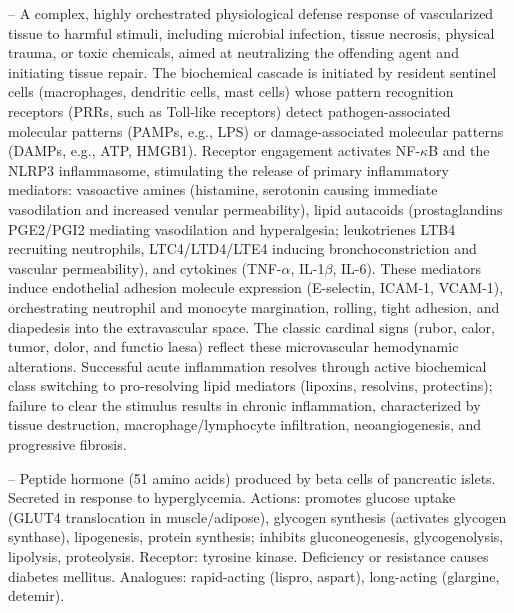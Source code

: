 -- A complex, highly orchestrated physiological defense response of vascularized tissue to harmful stimuli, including microbial infection, tissue necrosis, physical trauma, or toxic chemicals, aimed at neutralizing the offending agent and initiating tissue repair. The biochemical cascade is initiated by resident sentinel cells (macrophages, dendritic cells, mast cells) whose pattern recognition receptors (PRRs, such as Toll-like receptors) detect pathogen-associated molecular patterns (PAMPs, e.g., LPS) or damage-associated molecular patterns (DAMPs, e.g., ATP, HMGB1). Receptor engagement activates NF-$\kappa$B and the NLRP3 inflammasome, stimulating the release of primary inflammatory mediators: vasoactive amines (histamine, serotonin causing immediate vasodilation and increased venular permeability), lipid autacoids (prostaglandins PGE2/PGI2 mediating vasodilation and hyperalgesia; leukotrienes LTB4 recruiting neutrophils, LTC4/LTD4/LTE4 inducing bronchoconstriction and vascular permeability), and cytokines (TNF-$\alpha$, IL-1$\beta$, IL-6). These mediators induce endothelial adhesion molecule expression (E-selectin, ICAM-1, VCAM-1), orchestrating neutrophil and monocyte margination, rolling, tight adhesion, and diapedesis into the extravascular space. The classic cardinal signs (rubor, calor, tumor, dolor, and functio laesa) reflect these microvascular hemodynamic alterations. Successful acute inflammation resolves through active biochemical class switching to pro-resolving lipid mediators (lipoxins, resolvins, protectins); failure to clear the stimulus results in chronic inflammation, characterized by tissue destruction, macrophage/lymphocyte infiltration, neoangiogenesis, and progressive fibrosis.

-- Peptide hormone (51 amino acids) produced by beta cells of pancreatic islets. Secreted in response to hyperglycemia. Actions: promotes glucose uptake (GLUT4 translocation in muscle/adipose), glycogen synthesis (activates glycogen synthase), lipogenesis, protein synthesis; inhibits gluconeogenesis, glycogenolysis, lipolysis, proteolysis. Receptor: tyrosine kinase. Deficiency or resistance causes diabetes mellitus. Analogues: rapid-acting (lispro, aspart), long-acting (glargine, detemir).

